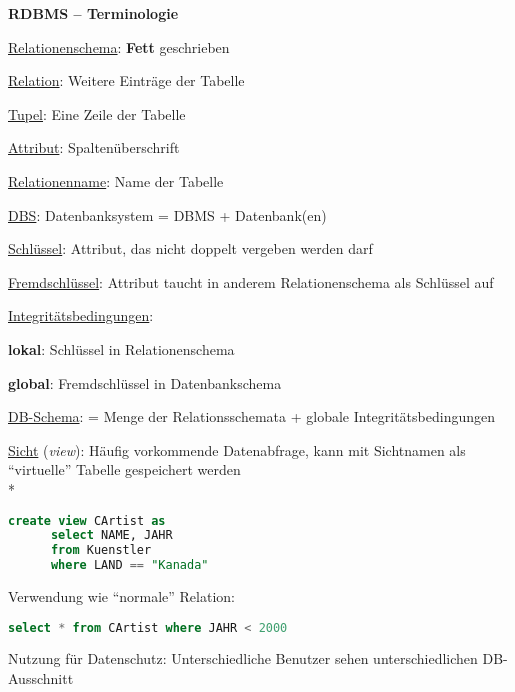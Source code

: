 \textbf{RDBMS -- Terminologie}
\begin{items}
  \item \underline{Relationenschema}: \textbf{Fett} geschrieben
  \item \underline{Relation}: Weitere Einträge der Tabelle
  \item \underline{Tupel}: Eine Zeile der Tabelle
  \item \underline{Attribut}: Spaltenüberschrift
  \item \underline{Relationenname}: Name der Tabelle
  \item \underline{DBS}: Datenbanksystem = DBMS + Datenbank(en)
  \item \underline{Schlüssel}: Attribut, das nicht doppelt vergeben werden darf
  \item \underline{Fremdschlüssel}: Attribut taucht in anderem Relationenschema als Schlüssel auf
  \item \underline{Integritätsbedingungen}:
  \begin{enumeration}
    \item \textbf{lokal}: Schlüssel in Relationenschema
    \item \textbf{global}: Fremdschlüssel in Datenbankschema
  \end{enumeration}
  \item \underline{DB-Schema}: = Menge der Relationsschemata + globale Integritätsbedingungen
  \item \underline{Sicht} (\emph{view}): Häufig vorkommende Datenabfrage, kann mit Sichtnamen als "`virtuelle"' Tabelle gespeichert werden \\*
  \begin{lstlisting}[language=sql]
    create view CArtist as
      select NAME, JAHR
      from Kuenstler
      where LAND == "Kanada"
  \end{lstlisting}
  \item Verwendung wie "`normale"' Relation:
  \begin{lstlisting}[language=sql]
    select * from CArtist where JAHR < 2000
  \end{lstlisting}
  \item Nutzung für Datenschutz: Unterschiedliche Benutzer sehen unterschiedlichen DB-Ausschnitt
\end{items}

\newpage

